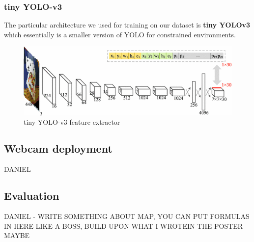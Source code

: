 \documentclass[a4paper]{article}
\begin{document}
\subsubsection*{tiny YOLO-v3}

The particular architecture we used for training on our dataset is \textbf{tiny YOLOv3} which essentially is a smaller version of YOLO for constrained environments.
\begin{figure}


\includegraphics[width=1\linewidth]{tinyyolo}
\caption{tiny YOLO-v3 feature extractor}
\end{figure}

\subsection{Webcam deployment}
DANIEL
\subsection{Evaluation}
DANIEL - WRITE SOMETHING ABOUT MAP, YOU CAN PUT FORMULAS IN HERE LIKE A BOSS, BUILD UPON WHAT I WROTEIN THE POSTER MAYBE
\end{document}
